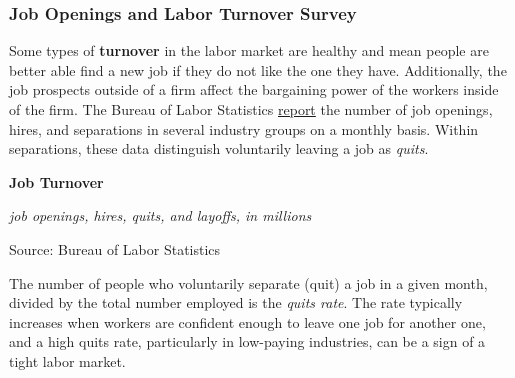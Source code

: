 \documentclass{report}
\makeatletter
\newcommand{\tbllink}[1]{\href{https://raw.githubusercontent.com/bdecon/US-chartbook/master/chartbook/data/#1}{\faTable}}
\newcommand*\short[1]{\expandafter\@gobbletwo\number\numexpr#1\relax}
\newcommand{\stdnode}[3]{\node[below, align=left, shift=({#1,#2})]{#3};}
\newcommand{\dateaxisticks}{
		date coordinates in=x, axis line style={draw=none},
		xmax={2020-10-01},
		max space between ticks=40,	    
		xtick={{1990-01-01}, {1992-01-01}, {1994-01-01}, 
			{1996-01-01}, {1998-01-01}, {2000-01-01}, 
			{2002-01-01}, {2004-01-01}, {2006-01-01},
			{2008-01-01}, {2010-01-01}, {2012-01-01}, {2014-01-01},
		    {2016-01-01}, {2018-01-01}, {2020-01-01}},
		minor xtick={{1989-01-01}, {1991-01-01}, {1993-01-01},
			{1995-01-01}, {1997-01-01}, {1999-01-01}, 
			{2001-01-01}, {2003-01-01}, {2005-01-01}, {2007-01-01},
		    {2009-01-01}, {2011-01-01}, {2013-01-01}, {2015-01-01},
		    {2017-01-01}, {2019-01-01}},
		enlarge y limits={0.06}, enlarge x limits={0.01},
		}
\newcommand{\bbar}[2]{extra #1 ticks = {{#2}}, extra #1 tick labels = ,
		extra #1 tick style = {grid=major, grid style={thick, black!25}},}
\newcommand{\stdline}[4]{\addplot[very thick, no markers, color=#1] 
		table [x=#2, y=#3, col sep=comma] {#4};	}
\newcommand{\rbars}{
		\fill[color=black!10] (axis cs:{1990-07-01},\pgfkeysvalueof{/pgfplots/ymin}) rectangle 
			(axis cs:{1991-03-01}, \pgfkeysvalueof{/pgfplots/ymax});
		\fill[color=black!10] (axis cs:{2007-12-01},\pgfkeysvalueof{/pgfplots/ymin}) rectangle 
			(axis cs:{2009-07-01}, \pgfkeysvalueof{/pgfplots/ymax});
		\fill[color=black!10] (axis cs:{2001-03-01},\pgfkeysvalueof{/pgfplots/ymin}) rectangle 
			(axis cs:{2001-11-01}, \pgfkeysvalueof{/pgfplots/ymax});
		\fill[color=black!10] (axis cs:{2020-02-01},\pgfkeysvalueof{/pgfplots/ymin}) rectangle 
			(axis cs:{2020-10-01}, \pgfkeysvalueof{/pgfplots/ymax});}
\makeatother
\begin{document}
{{{{{{{{{\newpage
\begin{minipage}{0.76\textwidth}
\subsubsection*{\color{black!70} \seriffont Job Openings and Labor Turnover Survey}
\small Some types of \textbf{turnover} in the labor market are healthy and mean people are better able find a new job if they do not like the one they have. Additionally, the job prospects outside of a firm affect the bargaining power of the workers inside of the firm. The Bureau of Labor Statistics \href{https://www.bls.gov/news.release/pdf/jolts.pdf}{report} the number of job openings, hires, and separations in several industry groups on a monthly basis. Within separations, these data distinguish voluntarily leaving a job as \textit{quits}. \\

\small 

\vspace{3mm}

\normalsize \textbf{Job Turnover}

\footnotesize{\textit{job openings, hires, quits, and layoffs, in millions}}

\hspace*{-2mm} 

\footnotesize{Source: Bureau of Labor Statistics} \hfill \tbllink{jolts.csv} 

\vspace{3mm}

\small The number of people who voluntarily separate (quit) a job in a given month, divided by the total number employed is the \textit{quits rate}. The rate typically increases when workers are confident enough to leave one job for another one, and a high quits rate, particularly in low-paying industries, can be a sign of a tight labor market.
\end{minipage}
\vspace{1mm}

}}}}}}}}}
\end{document}
